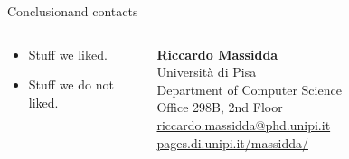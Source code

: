 \begin{frame}{Conclusion}{and contacts}
  \centering
  \begin{columns}
    \begin{column}{0.55\textwidth}
      \begin{itemize}
        \item Stuff we liked.
        \item Stuff we do not liked.
      \end{itemize}
    \end{column}
    \begin{column}{0.45\textwidth}
      \pause\textbf{Riccardo Massidda}\\
      {Università di Pisa}\\
      {Department of Computer Science}\\
      {Office 298B, 2nd Floor}\\[1em]
      \href{mailto:riccardo.massidda@phd.unipi.it}{riccardo.massidda@phd.unipi.it}
      \href{https://pages.di.unipi.it/massidda/}{pages.di.unipi.it/massidda/}
    \end{column}
  \end{columns}
\end{frame}
